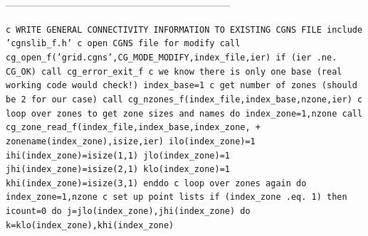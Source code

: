 \documentclass[12pt]{article}
\begin{document}
--------------------------------------------------------------------

{\tt \noindent c  WRITE GENERAL CONNECTIVITY INFORMATION TO EXISTING CGNS FILE
\newline\indent      include 'cgnslib\_f.h'
\newline c  open CGNS file for modify
\newline\indent      call cg\_open\_f('grid.cgns',CG\_MODE\_MODIFY,index\_file,ier)
\newline\indent      if (ier .ne. CG\_OK) call cg\_error\_exit\_f
\newline c  we know there is only one base (real working code would check!)
\newline\indent      index\_base=1
\newline c   get number of zones (should be 2 for our case)
\newline\indent      call cg\_nzones\_f(index\_file,index\_base,nzone,ier)
\newline c   loop over zones to get zone sizes and names
\newline\indent      do index\_zone=1,nzone
\newline\indent\indent      call cg\_zone\_read\_f(index\_file,index\_base,index\_zone,
\newline \indent + \indent zonename(index\_zone),isize,ier)
\newline\indent\indent      ilo(index\_zone)=1
\newline\indent\indent      ihi(index\_zone)=isize(1,1)
\newline\indent\indent      jlo(index\_zone)=1
\newline\indent\indent      jhi(index\_zone)=isize(2,1)
\newline\indent\indent      klo(index\_zone)=1
\newline\indent\indent      khi(index\_zone)=isize(3,1)
\newline\indent      enddo
\newline c   loop over zones again
\newline\indent      do index\_zone=1,nzone
\newline c   set up point lists
\newline\indent\indent   if (index\_zone .eq. 1) then
\newline\indent\indent\indent   icount=0
\newline\indent\indent\indent   do j=jlo(index\_zone),jhi(index\_zone)
\newline\indent\indent\indent\indent     do k=klo(index\_zone),khi(index\_zone)
}
\end{document}
